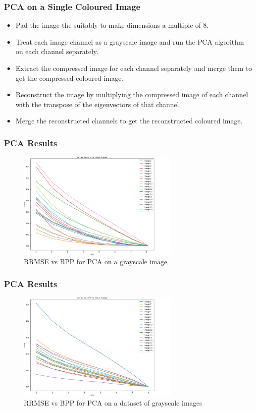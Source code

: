 \documentclass[Serif, 10pt, brown]{beamer}
\theoremstyle{example}
\theoremstyle{plain}
\begin{document}
\begin{frame}
	\frametitle{PCA on a Single Coloured Image}
	\begin{itemize}
		\item Pad the image the suitably to make dimensions a multiple of $8$.
		\item Treat each image channel as a grayscale image and run the PCA algorithm on each channel separately.
		\item Extract the compressed image for each channel separately and merge them to get the compressed coloured image.
		\item Reconstruct the image by multiplying the compressed image of each channel with the transpose of the eigenvectors of that channel.
		\item Merge the reconstructed channels to get the reconstructed coloured image.
	\end{itemize}
\end{frame}

\begin{frame}
	\frametitle{PCA Results}
	\begin{figure}
		\centering
		\includegraphics[width=0.7\textwidth]{../results/pca.png}
		\caption{RRMSE vs BPP for PCA on a grayscale image}
	\end{figure}
\end{frame}

\begin{frame}
	\frametitle{PCA Results}
	\begin{figure}
		\centering
		\includegraphics[width=0.7\textwidth]{../results/dpca.png}
		\caption{RRMSE vs BPP for PCA on a dataset of grayscale images}
	\end{figure}
\end{frame}
\end{document}
